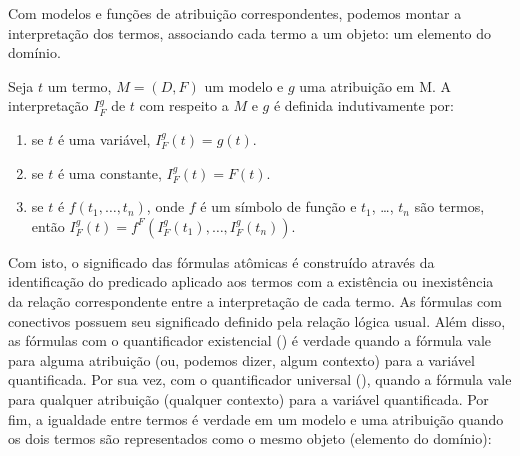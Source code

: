 Com modelos e funções de atribuição correspondentes, podemos montar a interpretação dos termos, associando cada termo a um objeto: um elemento do domínio. 

\begin{defn}[Interpretação]
Seja $t$ um termo, $M = (D,F)$ um modelo e $g$ uma atribuição em M. A interpretação $I_F^g$ de $t$ com respeito a $M$ e $g$ é definida indutivamente por:
\begin{enumerate}
\item se $t$ é uma variável, $I_F^g(t) = g(t)$.
\item se $t$ é uma constante, $I_F^g(t) = F(t)$.
\item se $t$ é $f(t_1,\dots,t_n)$, onde $f$ é um símbolo de função e $t_1$, \dots, $t_n$ são termos, então $I_F^g(t) = f^{F}(I_F^g(t_1), \dots, I_F^g(t_n))$.
\end{enumerate}
\end{defn}

Com isto, o significado das fórmulas atômicas é construído através da identificação do predicado aplicado aos termos com a existência ou inexistência da relação correspondente entre a interpretação de cada termo. As fórmulas com conectivos possuem seu significado definido pela relação lógica usual. Além disso, as fórmulas com o quantificador existencial (\expr{$\exists$}) é verdade quando a fórmula vale para alguma atribuição (ou, podemos dizer, algum contexto) para a variável quantificada. Por sua vez, com o quantificador universal (\expr{$\forall$}), quando a fórmula vale para qualquer atribuição (qualquer contexto) para a variável quantificada. Por fim, a igualdade entre termos é verdade em um modelo e uma atribuição quando os dois termos são representados como o mesmo objeto (elemento do domínio):

